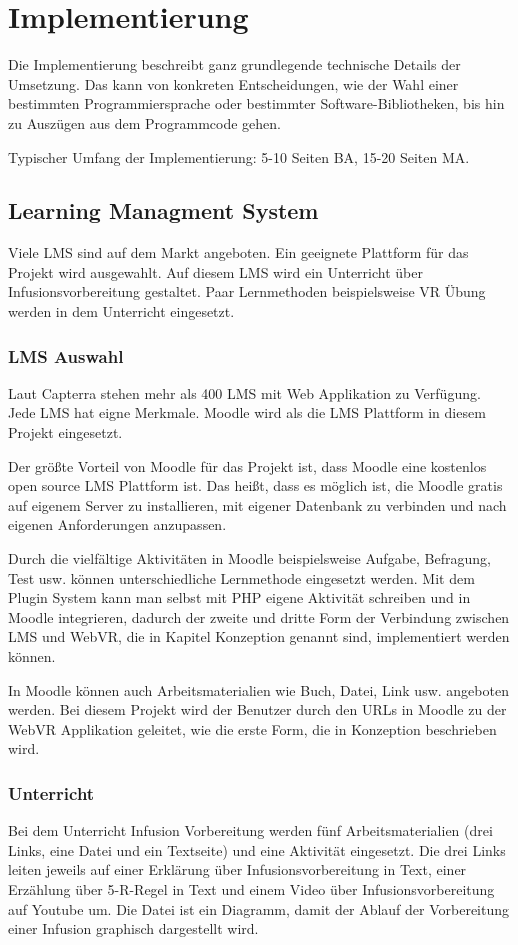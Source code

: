 \chapter{Implementierung}

Die Implementierung beschreibt ganz grundlegende technische Details der Umsetzung. Das kann von konkreten Entscheidungen, wie der Wahl einer bestimmten Programmiersprache oder bestimmter Software-Bibliotheken, bis hin zu Auszügen aus dem Programmcode gehen.

Typischer Umfang der Implementierung: 5-10 Seiten BA, 15-20 Seiten MA.

\section{Learning Managment System}
Viele LMS sind auf dem Markt angeboten. Ein geeignete Plattform für das Projekt wird ausgewahlt. Auf diesem LMS wird ein Unterricht über Infusionsvorbereitung gestaltet. Paar Lernmethoden beispielsweise VR Übung werden in dem Unterricht eingesetzt. 

 \subsection{LMS Auswahl}
 Laut Capterra stehen mehr als 400 LMS mit Web Applikation zu Verfügung. Jede LMS hat eigne Merkmale. Moodle wird als die LMS Plattform in diesem Projekt eingesetzt.
 
 Der größte Vorteil von Moodle für das Projekt ist, dass Moodle eine kostenlos open source LMS Plattform ist. Das heißt, dass es möglich ist, die Moodle gratis auf eigenem Server zu installieren, mit eigener Datenbank zu verbinden und nach eigenen Anforderungen anzupassen.
 
 Durch die vielfältige Aktivitäten in Moodle beispielsweise Aufgabe, Befragung, Test usw. können unterschiedliche Lernmethode eingesetzt werden. Mit dem Plugin System kann man selbst mit PHP eigene Aktivität schreiben und in Moodle integrieren, dadurch der zweite und dritte Form der Verbindung zwischen LMS und WebVR, die in Kapitel Konzeption genannt sind, implementiert werden können.
 
 In Moodle können auch Arbeitsmaterialien wie Buch, Datei, Link usw. angeboten werden. Bei diesem Projekt wird der Benutzer durch den URLs in Moodle zu der WebVR Applikation geleitet, wie die erste Form, die in Konzeption beschrieben wird. 
 
 \subsection{Unterricht}
 Bei dem Unterricht Infusion Vorbereitung werden fünf Arbeitsmaterialien (drei Links, eine Datei und ein Textseite) und eine Aktivität eingesetzt. Die drei Links leiten jeweils auf einer Erklärung über Infusionsvorbereitung in Text, einer Erzählung über 5-R-Regel in Text und einem Video über Infusionsvorbereitung auf Youtube um. Die Datei ist ein Diagramm, damit der Ablauf der Vorbereitung einer Infusion graphisch dargestellt wird.
 
